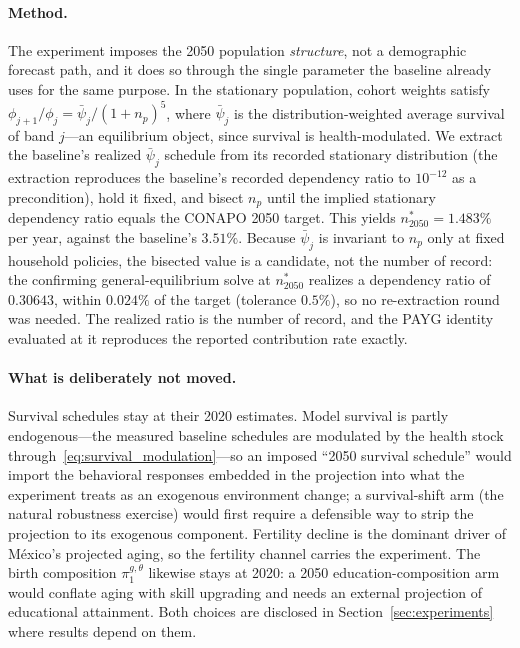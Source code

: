 \documentclass[12pt,a4paper]{article}
\begin{document}
\begin{appendices}
\paragraph{Method.} The experiment imposes the 2050 population \emph{structure}, not a demographic forecast path, and it does so through the single parameter the baseline already uses for the same purpose. In the stationary population, cohort weights satisfy $\phi_{j+1}/\phi_j = \bar\psi_j/(1+n_p)^5$, where $\bar\psi_j$ is the distribution-weighted average survival of band $j$---an equilibrium object, since survival is health-modulated. We extract the baseline's realized $\bar\psi_j$ schedule from its recorded stationary distribution (the extraction reproduces the baseline's recorded dependency ratio to $10^{-12}$ as a precondition), hold it fixed, and bisect $n_p$ until the implied stationary dependency ratio equals the CONAPO 2050 target. This yields $n^{*}_{2050}=1.483\%$ per year, against the baseline's $3.51\%$. Because $\bar\psi_j$ is invariant to $n_p$ only at fixed household policies, the bisected value is a candidate, not the number of record: the confirming general-equilibrium solve at $n^{*}_{2050}$ realizes a dependency ratio of $0.30643$, within $0.024\%$ of the target (tolerance $0.5\%$), so no re-extraction round was needed. The realized ratio is the number of record, and the PAYG identity evaluated at it reproduces the reported contribution rate exactly.

\paragraph{What is deliberately not moved.} Survival schedules stay at their 2020 estimates. Model survival is partly endogenous---the measured baseline schedules are modulated by the health stock through~\eqref{eq:survival_modulation}---so an imposed ``2050 survival schedule'' would import the behavioral responses embedded in the projection into what the experiment treats as an exogenous environment change; a survival-shift arm (the natural robustness exercise) would first require a defensible way to strip the projection to its exogenous component. Fertility decline is the dominant driver of M\'exico's projected aging, so the fertility channel carries the experiment. The birth composition $\pi^{g,\theta}_1$ likewise stays at 2020: a 2050 education-composition arm would conflate aging with skill upgrading and needs an external projection of educational attainment. Both choices are disclosed in Section~\ref{sec:experiments} where results depend on them.



\end{appendices}
\end{document}
